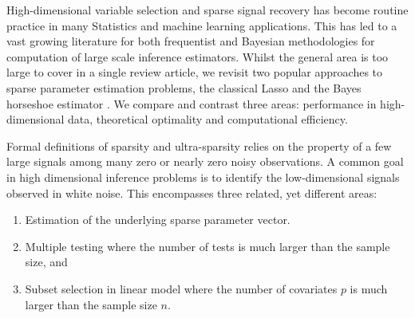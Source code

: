 \documentclass[11pt]{article}
\begin{document}


High-dimensional variable selection and sparse signal recovery has become routine practice in many Statistics and machine learning applications. This has led to a vast growing literature for both frequentist and Bayesian methodologies for computation of large scale inference estimators. Whilst the general area is too large to cover in a single review article, we revisit two popular approaches to sparse parameter estimation problems, the classical Lasso \citep{tibshirani96} and the Bayes horseshoe estimator \citep{carvalho2010horseshoe}. We compare and contrast three areas: performance in high-dimensional data, theoretical optimality and computational efficiency. 

Formal definitions of sparsity and ultra-sparsity relies on the property of a few large signals among many zero or nearly zero noisy observations. A common goal in high dimensional inference problems is to identify the low-dimensional signals observed in white noise. This encompasses three related, yet different areas: 
\begin{enumerate}
\item Estimation of the underlying sparse parameter vector. 
\item Multiple testing where the number of tests is much larger than the sample size, and 
\item Subset selection in linear model where the number of covariates $p$ is much larger than the sample size $n$. 
\end{enumerate}
\end{document}
